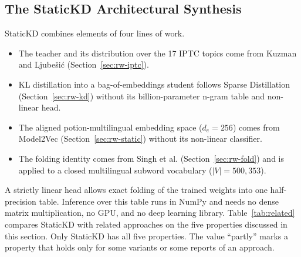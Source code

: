 \documentclass{ieeeaccess}
\begin{document}
\subsection{The StaticKD Architectural Synthesis}
StaticKD combines elements of four lines of work.
\begin{itemize}
  \item The teacher and its distribution over the 17 IPTC topics come from Kuzman and Ljube\v{s}i\'c (Section~\ref{sec:rw-iptc}).
  \item KL distillation into a bag-of-embeddings student follows Sparse Distillation (Section~\ref{sec:rw-kd}) without its billion-parameter n-gram table and non-linear head.
  \item The aligned potion-multilingual embedding space ($d_e=256$) comes from Model2Vec (Section~\ref{sec:rw-static}) without its non-linear classifier.
  \item The folding identity comes from Singh et al. (Section~\ref{sec:rw-fold}) and is applied to a closed multilingual subword vocabulary ($|V|=500{,}353$).
\end{itemize}
A strictly linear head allows exact folding of the trained weights into one half-precision table. Inference over this table runs in NumPy and needs no dense matrix multiplication, no GPU, and no deep learning library. Table~\ref{tab:related} compares StaticKD with related approaches on the five properties discussed in this section. Only StaticKD has all five properties. The value ``partly'' marks a property that holds only for some variants or some reports of an approach.
\end{document}
